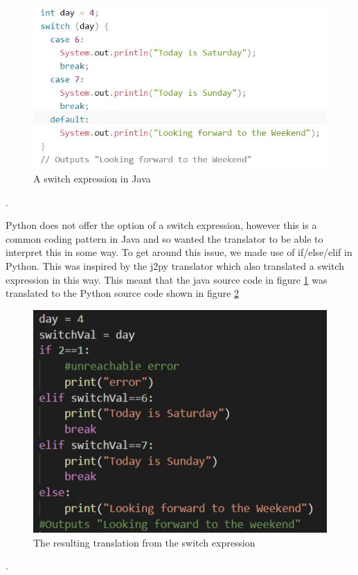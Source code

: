 \documentclass{l4proj}
\begin{document}
\begin{figure}[htb]
    \centering
    \includegraphics[width=1\linewidth]{images/switchJava.JPG}
        \caption{A switch expression in Java
    }
    \label{fig:switchJava} 
\end{figure}.

Python does not offer the option of a switch expression, however this is a common coding pattern in Java and so wanted the translator to be able to interpret this in some way. To get around this issue, we made use of if/else/elif in Python. This was inspired by the j2py translator which also translated a switch expression in this way. This meant that the java source code in figure \ref{fig:switchJava} was translated to the Python source code shown in figure \ref{fig:switchPython}

\begin{figure}[htb]
    \centering
    \includegraphics[width=1\linewidth]{images/switchTranslation.JPG}
        \caption{The resulting translation from the switch expression
    }
    \label{fig:switchPython} 
\end{figure}.
\end{document}
